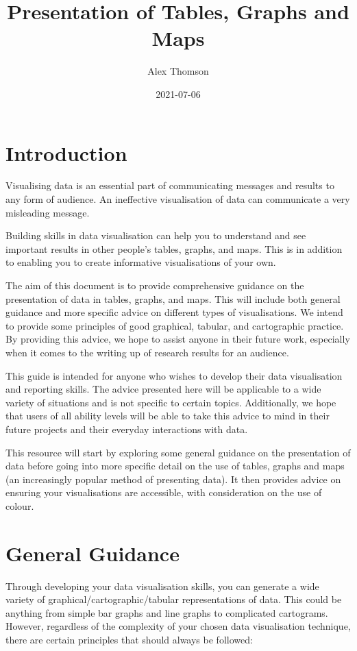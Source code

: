 \documentclass[
]{book}
\title{Presentation of Tables, Graphs and Maps}
\author{Alex Thomson}
\date{2021-07-06}
\begin{document}
\maketitle

{
\setcounter{tocdepth}{1}
\tableofcontents
}
\hypertarget{introduction}{%
\chapter{Introduction}\label{introduction}}

Visualising data is an essential part of communicating messages and results to any form of audience. An ineffective visualisation of data can communicate a very misleading message.

Building skills in data visualisation can help you to understand and see important results in other people's tables, graphs, and maps. This is in addition to enabling you to create informative visualisations of your own.

The aim of this document is to provide comprehensive guidance on the presentation of data in tables, graphs, and maps. This will include both general guidance and more specific advice on different types of visualisations. We intend to provide some principles of good graphical, tabular, and cartographic practice. By providing this advice, we hope to assist anyone in their future work, especially when it comes to the writing up of research results for an audience.

This guide is intended for anyone who wishes to develop their data visualisation and reporting skills. The advice presented here will be applicable to a wide variety of situations and is not specific to certain topics. Additionally, we hope that users of all ability levels will be able to take this advice to mind in their future projects and their everyday interactions with data.

This resource will start by exploring some general guidance on the presentation of data before going into more specific detail on the use of tables, graphs and maps (an increasingly popular method of presenting data). It then provides advice on ensuring your visualisations are accessible, with consideration on the use of colour.

\hypertarget{gg}{%
\chapter{General Guidance}\label{gg}}

Through developing your data visualisation skills, you can generate a wide variety of graphical/cartographic/tabular representations of data. This could be anything from simple bar graphs and line graphs to complicated cartograms. However, regardless of the complexity of your chosen data visualisation technique, there are certain principles that should always be followed:
\end{document}
